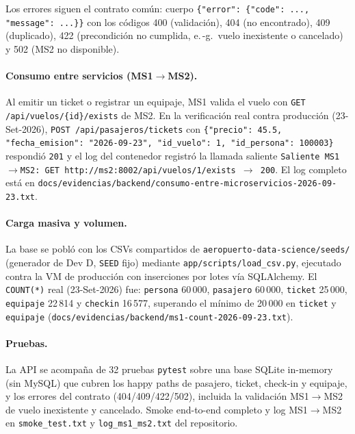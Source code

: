 Los errores siguen el contrato común: cuerpo
\texttt{\{"error": \{"code": ..., "message": ...\}\}} con los códigos 400
(validación), 404 (no encontrado), 409 (duplicado), 422 (precondición no
cumplida, e.\,-g.\ vuelo inexistente o cancelado) y 502 (MS2 no
disponible).

\paragraph{Consumo entre servicios (MS1$\to$MS2).}
Al emitir un ticket o registrar un equipaje, MS1 valida el vuelo con
\texttt{GET /api/vuelos/\{id\}/exists} de MS2. En la verificación real
contra producción (23-Set-2026), \texttt{POST /api/pasajeros/tickets} con
\texttt{\{"precio": 45.5, "fecha\_emision": "2026-09-23", "id\_vuelo": 1,
"id\_persona": 100003\}} respondió \texttt{201} y el log del contenedor
registró la llamada saliente \texttt{Saliente MS1$\to$MS2: GET
http://ms2:8002/api/vuelos/1/exists $\to$ 200}. El log completo está en
\texttt{docs/evidencias/backend/consumo-entre-microservicios-2026-09-23.txt}.

\paragraph{Carga masiva y volumen.}
La base se pobló con los CSVs compartidos de
\texttt{aeropuerto-data-science/seeds/} (generador de Dev D, \texttt{SEED}
fijo) mediante \texttt{app/scripts/load\_csv.py}, ejecutado contra la VM
de producción con inserciones por lotes vía SQLAlchemy. El
\texttt{COUNT(*)} real (23-Set-2026) fue: \texttt{persona} 60\,000,
\texttt{pasajero} 60\,000, \texttt{ticket} 25\,000, \texttt{equipaje}
22\,814 y \texttt{checkin} 16\,577, superando el mínimo de 20\,000 en
\texttt{ticket} y \texttt{equipaje}
(\texttt{docs/evidencias/backend/ms1-count-2026-09-23.txt}).

\paragraph{Pruebas.}
La API se acompaña de 32 pruebas \texttt{pytest} sobre una base SQLite
in-memory (sin MySQL) que cubren los happy paths de pasajero, ticket,
check-in y equipaje, y los errores del contrato (404/409/422/502),
incluida la validación MS1$\to$MS2 de vuelo inexistente y cancelado. Smoke
end-to-end completo y log MS1$\to$MS2 en \texttt{smoke\_test.txt} y
\texttt{log\_ms1\_ms2.txt} del repositorio.








